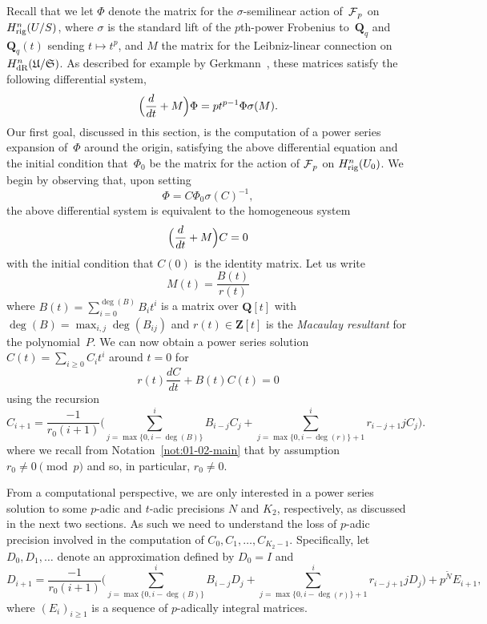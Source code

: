 Recall that we let $\Phi$ denote the matrix for the $\sigma$-semilinear action 
of~$\operatorname{\mathcal{F}}_p$ on $H_{\text{rig}}^{n}(U/S)$, where $\sigma$ is the standard lift of the 
$p$th-power Frobenius to~$\mathbf{Q}_q$ and~$\mathbf{Q}_q(t)$ sending 
$t \mapsto t^p$, and $M$ the matrix for the Leibniz-linear connection on 
$H_{\text{dR}}^n(\mathfrak{U}/\mathfrak{S})$.
As described for example by Gerkmann~\citep[\S 5]{Gerkmann2007}, these 
matrices satisfy the following differential system,
\begin{equation*}
\Bigl(\frac{d}{dt} + M\Bigr) \Phi = p t^{p-1} \Phi \sigma(M).
\end{equation*}
Our first goal, discussed in this section, is the computation of 
a power series expansion of~$\Phi$ around the origin, satisfying 
the above differential equation and the initial condition that~$\Phi_0$ 
be the matrix for the action of $\operatorname{\mathcal{F}}_p$ on $H_{\text{rig}}^n(U_0)$.
We begin by observing that, upon setting 
\begin{equation*}
\Phi = C \Phi_0 \sigma(C)^{-1},
\end{equation*}
the above differential system is equivalent to the homogeneous system 
\begin{equation} \label{eq:01-GMDE-Homogenous}
\Bigl(\frac{d}{dt} + M\Bigr) C = 0
\end{equation}
with the initial condition that $C(0)$ is the identity matrix.  Let us write 
\begin{equation*}
M(t) = \frac{B(t)}{r(t)}
\end{equation*}
where $B(t) = \sum_{i=0}^{\deg(B)} B_i t^i$ is a matrix over $\mathbf{Q}[t]$ 
with $\deg(B) = \max_{i,j} \deg(B_{ij})$ and $r(t) \in \mathbf{Z}[t]$ is the 
\emph{Macaulay resultant} for the polynomial~$P$.  We can now obtain a 
power series solution $C(t) = \sum_{i \geq 0} C_i t^i$ around $t=0$ for 
\begin{equation*}
r(t) \frac{dC}{dt} + B(t) C(t) = 0
\end{equation*}
using the recursion 
\begin{equation*}
C_{i+1} = \frac{-1}{r_0 (i+1)} \biggl(
    \sum_{j=\max{\{0,i-\deg(B)\}}}^i B_{i-j} C_j + 
    \sum_{j=\max{\{0,i-\deg(r)\}}+1}^i r_{i-j+1} j C_j \biggr).
\end{equation*}
where we recall from Notation~\ref{not:01-02-main} that by 
assumption $r_0 \neq 0 \pmod{p}$ and so, in particular, $r_0 \neq 0$.

From a computational perspective, we are only interested in a power 
series solution to some $p$-adic and $t$-adic precisions $N$ and $K_2$, 
respectively, as discussed in the next two sections.  As such we need 
to understand the loss of $p$-adic precision involved in the computation 
of $C_0, C_1, \dotsc, C_{K_2-1}$.  Specifically, let $D_0, D_1, \dotsc$ 
denote an approximation defined by $D_0 = I$ and 
\begin{equation*}
D_{i+1} = \frac{-1}{r_0 (i+1)} \biggl(
    \sum_{j=\max{\{0,i-\deg(B)\}}}^i B_{i-j} D_j + 
    \sum_{j=\max{\{0,i-\deg(r)\}}+1}^i r_{i-j+1} j D_j \biggr) + 
    p^{\tilde{N}} E_{i+1},
\end{equation*}
where $(E_i)_{i \geq 1}$ is a sequence of $p$-adically integral matrices. 

